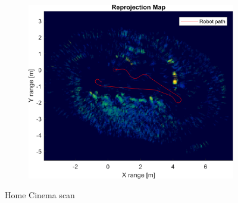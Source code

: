 \begin{figure}[htbp]
    \begin{subfigure}[t]{0.5\linewidth}   
        \centering 
        \includegraphics[width=\linewidth,max height=.475\textheight]{gfx/results/homecinema_reprojection.png}
    \end{subfigure}%
    \caption{Home Cinema scan}
\end{figure}

